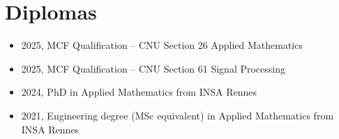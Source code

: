 \section{Diplomas}

\begin{itemize}
    \item 2025, MCF Qualification -- CNU Section 26 Applied Mathematics
    \item 2025, MCF Qualification -- CNU Section 61 Signal Processing
    \item 2024, PhD in Applied Mathematics from INSA Rennes
    \item 2021, Engineering degree (MSc equivalent) in Applied Mathematics from INSA Rennes
\end{itemize}